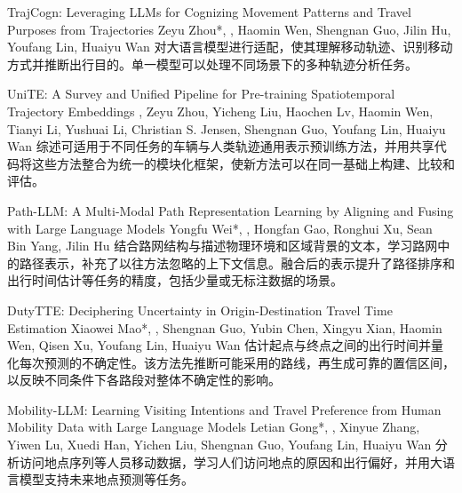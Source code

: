 {TrajCogn: Leveraging LLMs for Cognizing Movement Patterns and Travel Purposes from Trajectories}
{Zeyu Zhou*, \me*, Haomin Wen, Shengnan Guo, Jilin Hu, Youfang Lin, Huaiyu Wan}
{对大语言模型进行适配，使其理解移动轨迹、识别移动方式并推断出行目的。单一模型可以处理不同场景下的多种轨迹分析任务。}

{UniTE: A Survey and Unified Pipeline for Pre-training Spatiotemporal Trajectory Embeddings}
{\me, Zeyu Zhou, Yicheng Liu, Haochen Lv, Haomin Wen, Tianyi Li, Yushuai Li, Christian S. Jensen, Shengnan Guo, Youfang Lin, Huaiyu Wan}
{综述可适用于不同任务的车辆与人类轨迹通用表示预训练方法，并用共享代码将这些方法整合为统一的模块化框架，使新方法可以在同一基础上构建、比较和评估。}

{Path-LLM: A Multi-Modal Path Representation Learning by Aligning and Fusing with Large Language Models}
{Yongfu Wei*, \me*, Hongfan Gao, Ronghui Xu, Sean Bin Yang, Jilin Hu}
{结合路网结构与描述物理环境和区域背景的文本，学习路网中的路径表示，补充了以往方法忽略的上下文信息。融合后的表示提升了路径排序和出行时间估计等任务的精度，包括少量或无标注数据的场景。}

{DutyTTE: Deciphering Uncertainty in Origin-Destination Travel Time Estimation}
{Xiaowei Mao*, \me*, Shengnan Guo, Yubin Chen, Xingyu Xian, Haomin Wen, Qisen Xu, Youfang Lin, Huaiyu Wan}
{估计起点与终点之间的出行时间并量化每次预测的不确定性。该方法先推断可能采用的路线，再生成可靠的置信区间，以反映不同条件下各路段对整体不确定性的影响。}

{Mobility-LLM: Learning Visiting Intentions and Travel Preference from Human Mobility Data with Large Language Models}
{Letian Gong*, \me*, Xinyue Zhang, Yiwen Lu, Xuedi Han, Yichen Liu, Shengnan Guo, Youfang Lin, Huaiyu Wan}
{分析访问地点序列等人员移动数据，学习人们访问地点的原因和出行偏好，并用大语言模型支持未来地点预测等任务。}

